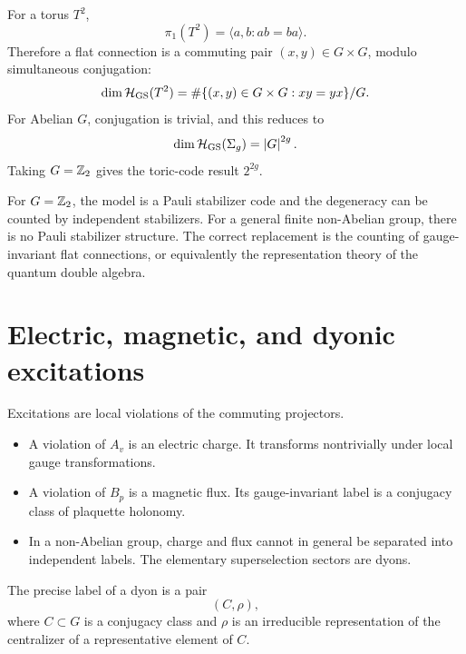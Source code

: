 For a torus \(T^2\),
\begin{equation}
\label{eq:torus-fundamental-group-commuting-pairs}
    \pi_1(T^2)=\langle a,b:ab=ba\rangle .
\end{equation}
Therefore a flat connection is a commuting pair \((x,y)\in G\times G\), modulo
simultaneous conjugation:
\begin{equation}
\label{eq:torus-ground-state-commuting-pairs}
    \dim\mathcal{H}_{\rm GS}(T^2)
    =
    \#\{(x,y)\in G\times G:xy=yx\}/G .
\end{equation}
For Abelian \(G\), conjugation is trivial, and this reduces to
\begin{equation}
\label{eq:abelian-quantum-double-ground-degeneracy}
    \dim\mathcal{H}_{\rm GS}(\Sigma_g)=\left|G\right|^{2g} .
\end{equation}
Taking \(G=\mathbb{Z}_2\) gives the toric-code result \(2^{2g}\).

\begin{remark}
For \(G=\mathbb{Z}_2\), the model is a Pauli stabilizer code and the degeneracy can be
counted by independent stabilizers.  For a general finite non-Abelian group,
there is no Pauli stabilizer structure.  The correct replacement is the counting
of gauge-invariant flat connections, or equivalently the representation theory
of the quantum double algebra.
\end{remark}

\section{Electric, magnetic, and dyonic excitations}
\label{sec:quantum-double-excitations}

Excitations are local violations of the commuting projectors.
\begin{itemize}[leftmargin=2.2em]
    \item A violation of \(A_v\) is an electric charge.  It transforms
    nontrivially under local gauge transformations.
    \item A violation of \(B_p\) is a magnetic flux.  Its gauge-invariant label
    is a conjugacy class of plaquette holonomy.
    \item In a non-Abelian group, charge and flux cannot in general be separated
    into independent labels.  The elementary superselection sectors are dyons.
\end{itemize}
The precise label of a dyon is a pair
\begin{equation}
\label{eq:quantum-double-anyon-label-pair}
    (C,\rho),
\end{equation}
where \(C\subset G\) is a conjugacy class and \(\rho\) is an irreducible
representation of the centralizer of a representative element of \(C\).

